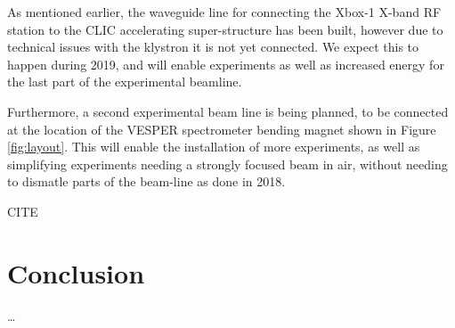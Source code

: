 \documentclass[a4paper,
               keeplastbox,   %
               ]{jacow}
\begin{document}
As mentioned earlier, the waveguide line for connecting the Xbox-1 X-band RF station to the CLIC accelerating super-structure has been built, however due to technical issues with the klystron it is not yet connected.
We expect this to happen during 2019, and will enable experiments  as well as increased energy for the last part of the experimental beamline.

Furthermore, a second experimental beam line is being planned, to be connected at the location of the VESPER spectrometer bending magnet shown in Figure \ref{fig:layout}.
This will enable the installation of more experiments, as well as simplifying experiments needing a strongly focused beam in air, without needing to dismatle parts of the beam-line as done in 2018.

CITE~\cite{Roberto::CLEARrev}

\section{Conclusion}

\ldots
\end{document}
